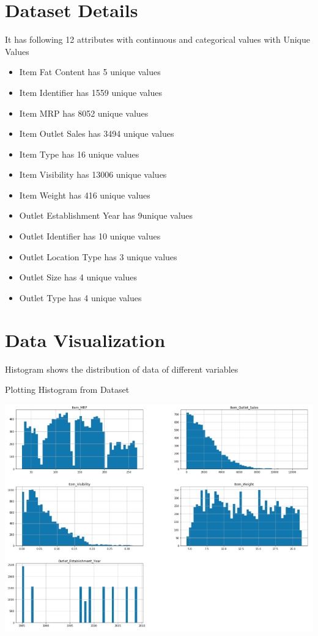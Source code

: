 \section{Dataset Details}
It has following 12 attributes with continuous and categorical values 
with Unique Values
\begin{itemize}
\item Item Fat Content has 5 unique values
\item Item Identifier has 1559 unique values
\item Item MRP has 8052 unique values
\item Item Outlet Sales has 3494 unique values
\item Item Type has 16 unique values
\item Item Visibility has 13006 unique values
\item Item Weight has 416 unique values
\item Outlet Establishment Year has 9unique values
\item Outlet Identifier has 10 unique values
\item Outlet Location Type has 3 unique values
\item Outlet Size has 4 unique values
\item Outlet Type has 4 unique values
\end{itemize}


\section{Data Visualization}
Histogram shows the distribution of data of different variables 

Plotting Histogram from Dataset


\includegraphics[width=\columnwidth]
{Images/mlstudio/HistrogramofImpAttributes.png}


